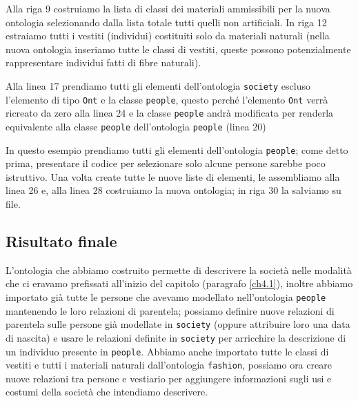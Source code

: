 Alla riga 9 costruiamo la lista di classi dei materiali ammissibili per la nuova ontologia selezionando dalla lista totale tutti quelli non artificiali. In riga 12 estraiamo tutti i vestiti (individui) costituiti solo da materiali naturali (nella nuova ontologia inseriamo tutte le classi di vestiti, queste possono potenzialmente rappresentare individui fatti di fibre naturali).

Alla linea 17 prendiamo tutti gli elementi dell'ontologia \verb|society| escluso l'elemento di tipo \verb|Ont| e la classe \verb|people|, questo perché l'elemento \verb|Ont| verrà ricreato da zero alla linea 24 e la classe \verb|people| andrà modificata per renderla equivalente alla classe \verb|people| dell'ontologia \verb|people| (linea 20)

In questo esempio prendiamo tutti gli elementi dell'ontologia \verb|people|; come detto prima, presentare il codice per selezionare solo alcune persone sarebbe poco istruttivo. Una volta create tutte le nuove liste di elementi, le assembliamo alla linea 26 e, alla linea 28 costruiamo la nuova ontologia; in riga 30 la salviamo su file.
\subsection{Risultato finale}
L'ontologia che abbiamo costruito permette di descrivere la società nelle modalità che ci eravamo prefissati all'inizio del capitolo (paragrafo \ref{ch4.1}), inoltre abbiamo importato già tutte le persone che avevamo modellato nell'ontologia \verb|people| mantenendo le loro relazioni di parentela; possiamo definire nuove relazioni di parentela sulle persone già modellate in \verb|society| (oppure attribuire loro una data di nascita) e usare le relazioni definite in \verb|society| per arricchire la descrizione di un individuo presente in \verb|people|. Abbiamo anche importato tutte le classi di vestiti e tutti i materiali naturali dall'ontologia \verb|fashion|, possiamo ora creare nuove relazioni tra persone e vestiario  per aggiungere informazioni sugli usi e costumi della società che intendiamo descrivere.

